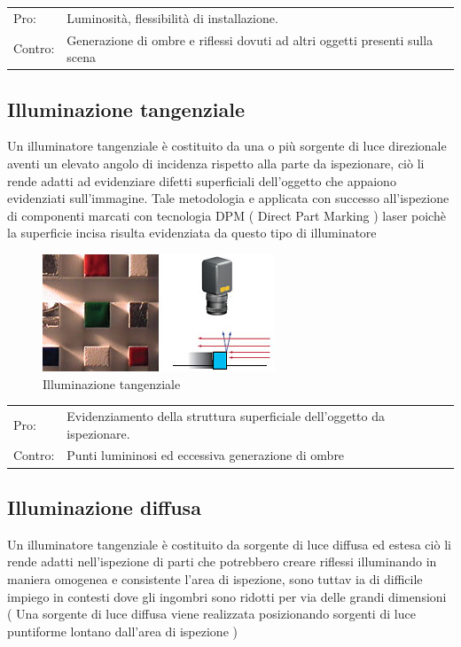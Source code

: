 \begin{centering}
\centering
\begin{tabular}{l l}
Pro: &  Luminosità, flessibilità di installazione. \\
Contro: &  Generazione di ombre e riflessi dovuti ad altri oggetti presenti sulla scena \\
\end{tabular}
\end{centering}


\subsection{Illuminazione tangenziale}

Un illuminatore tangenziale è costituito da una o più 
sorgente di luce direzionale aventi un elevato angolo di 
incidenza rispetto alla parte da ispezionare, ciò li rende 
adatti ad evidenziare difetti superficiali dell’oggetto che 
appaiono evidenziati sull’immagine.  
Tale metodologia e applicata con successo all’ispezione di 
componenti marcati con tecnologia DPM ( Direct Part 
Marking ) laser poichè la superficie incisa risulta evidenziata 
da questo tipo di illuminatore 

\begin{figure}
\centering
\includegraphics[width=.3\textwidth]{img/illuminazione-tangenziale.jpg}
\caption{Illuminazione tangenziale}\label{fig:illuminazione-tangenziale}
\end{figure}

\begin{centering}
\centering
\begin{tabular}{l l}
Pro: &  Evidenziamento della struttura superficiale dell'oggetto da ispezionare. \\
Contro: &  Punti lumininosi ed eccessiva generazione di ombre \\
\end{tabular}
\end{centering}


\subsection{Illuminazione diffusa}
Un illuminatore tangenziale è costituito da sorgente di luce 
diffusa ed estesa ciò li rende adatti nell’ispezione di parti 
che potrebbero creare riflessi illuminando in maniera 
omogenea e consistente l’area di ispezione, sono tuttav ia 
di difficile impiego in contesti dove gli ingombri sono 
ridotti per via delle grandi dimensioni ( Una sorgente di 
luce diffusa viene realizzata posizionando sorgenti di luce 
puntiforme lontano dall’area di ispezione )  
 

